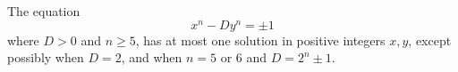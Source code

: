 \begin{proposition}\label{eq:163}
    The equation
\[
    x^n-Dy^n=\pm1
\]
    where $D>0$ and $n\ge5$, has at most one solution in positive integers $x,y$, except possibly when $D=2$, and when $n=5$ or $6$ and $D=2^n\pm1$.
\end{proposition}

